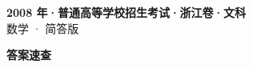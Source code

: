\documentclass[zihao=-4, a4paper]{ctexart}
\begin{document}
\begin{center}
  {\Large\bfseries 2008 年·普通高等学校招生考试·浙江卷·文科}\\[4pt]
  {\large 数学 · 简答版}
\end{center}
\medskip
{}

\clearpage
{}
\begin{center}{\Large\bfseries 答案速查}\end{center}
\medskip

\end{document}
